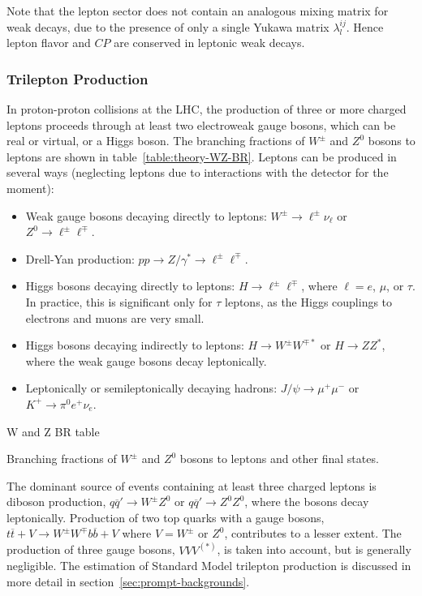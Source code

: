 Note that the lepton sector does not contain an analogous mixing matrix for weak decays, due to the presence of only a single Yukawa matrix $\lambda^{ij}_l$. Hence lepton flavor and $CP$ are conserved in leptonic weak decays.

\subsubsection{Trilepton Production}
In proton-proton collisions at the LHC, the production of three or more charged leptons proceeds through at least two electroweak gauge bosons, which can be real or virtual, or a Higgs boson. The branching fractions of $W^{\pm}$ and $Z^0$ bosons to leptons are shown in table~\ref{table:theory-WZ-BR}. Leptons can be produced in several ways (neglecting leptons due to interactions with the detector for the moment):

\begin{itemize}
	\item Weak gauge bosons decaying directly to leptons: $W^{\pm}\rightarrow \ell^{\pm}\nu_{\ell}$ or $Z^0\rightarrow \ell^{\pm}\ell^{\mp}$.
	\item Drell-Yan production: $pp\rightarrow Z/\gamma^{*}\rightarrow\ell^{\pm}\ell^{\mp}$. 
	\item Higgs bosons decaying directly to leptons: $H\rightarrow \ell^{\pm}\ell^{\mp}$, where $\ell=e$, $\mu$, or $\tau$. In practice, this is significant only for $\tau$ leptons, as the Higgs couplings to electrons and muons are very small.
	\item Higgs bosons decaying indirectly to leptons: $H\rightarrow W^{\pm}W^{\mp*}$ or $H\rightarrow ZZ^{*}$, where the weak gauge bosons decay leptonically.
	\item Leptonically or semileptonically decaying hadrons: $J/\psi\rightarrow \mu^+\mu^-$ or $K^+\rightarrow \pi^0 e^+ \nu_{e}$. 
\end{itemize}

\begin{table}[htbp]
	\centering
	W and Z BR table
	\caption{Branching fractions of $W^{\pm}$ and $Z^0$ bosons to leptons and other final states.}
	\label{table:theory-WZ-BR}
\end{table}

The dominant source of events containing at least three charged leptons is diboson production, $q\overline{q}'\rightarrow W^{\pm}Z^0$ or $q\overline{q}'\rightarrow Z^0Z^0$, where the bosons decay leptonically. Production of two top quarks with a gauge bosons, $t\overline{t}+V\rightarrow W^{\pm}W^{\mp}b\overline{b}+V$ where $V=W^{\pm}$ or $Z^0$, contributes to a lesser extent. The production of three gauge bosons, $VVV^{(*)}$, is taken into account, but is generally negligible. The estimation of Standard Model trilepton production is discussed in more detail in section~\ref{sec:prompt-backgrounds}. 



